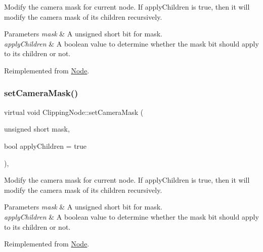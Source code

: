 Modify the camera mask for current node. If apply\+Children is true, then it will modify the camera mask of its children recursively. 
\begin{DoxyParams}{Parameters}
{\em mask} & A unsigned short bit for mask. \\
\hline
{\em apply\+Children} & A boolean value to determine whether the mask bit should apply to its children or not. \\
\hline
\end{DoxyParams}


Reimplemented from \hyperlink{classNode_a0403546687b2cb6fc211fb461e33ba4d}{Node}.

\mbox{\label{classClippingNode_a1a2f97b7a006e6b830632eab1e812f90}} 
\subsubsection{\texorpdfstring{set\+Camera\+Mask()}{setCameraMask()}\hspace{0.1cm}{\footnotesize\ttfamily [2/2]}}
{\footnotesize\ttfamily virtual void Clipping\+Node\+::set\+Camera\+Mask (\begin{DoxyParamCaption}\item[{unsigned short}]{mask,  }\item[{bool}]{apply\+Children = {\ttfamily true} }\end{DoxyParamCaption})\hspace{0.3cm}{\ttfamily [override]}, {\ttfamily [virtual]}}

Modify the camera mask for current node. If apply\+Children is true, then it will modify the camera mask of its children recursively. 
\begin{DoxyParams}{Parameters}
{\em mask} & A unsigned short bit for mask. \\
\hline
{\em apply\+Children} & A boolean value to determine whether the mask bit should apply to its children or not. \\
\hline
\end{DoxyParams}


Reimplemented from \hyperlink{classNode_a0403546687b2cb6fc211fb461e33ba4d}{Node}.

\mbox{\label{classClippingNode_a0733496b02e0a3673ad3c8634ff757ed}} 
